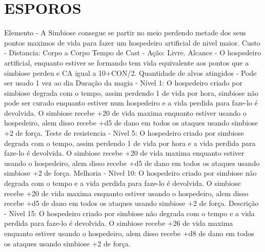 \documentclass{article}%
\begin{document}
%
\section{ESPOROS}%
\label{sec:ESPOROS}%
Elemento {-}  A Simbiose consegue se partir no meio perdendo metade dos seus pontos maximos de vida para fazer um hospedeiro artificial de nivel maior.\newline%
Custo {-} Distancia: Corpo a Corpo\newline%
Tempo de Cast {-} Ação: Livre.\newline%
Alcance {-} O hospedeiro artificial, enquanto estiver se formando tem vida equivalente aos pontos que a simbiose perdeu e CA igual a 10+CON/2.\newline%
Quantidade de alvos atingidos {-} Pode ser usado 1 vez ao dia\newline%
Duração da magia {-} Nível 1: O hospedeiro criado por simbiose degrada com o tempo, assim perdendo 1 de vida por hora, simbiose não pode ser curado enquanto estiver num hospedeiro e a vida perdida para faze{-}lo é devolvida. O simbiose recebe +20 de vida maxima enquanto estiver usando o hospedeiro, alem disso recebe +d5 de dano em todos os ataques usando simbiose +2 de força.\newline%
Teste de resistencia {-} Nível 5: O hospedeiro criado por simbiose degrada com o tempo, assim perdendo 1 de vida por hora e a vida perdida para faze{-}lo é devolvida. O simbiose recebe +20 de vida maxima enquanto estiver usando o hospedeiro, alem disso recebe +d5 de dano em todos os ataques usando simbiose +2 de força.\newline%
Melhoria {-} Nível 10: O hospedeiro criado por simbiose não degrada com o tempo e a vida perdida para faze{-}lo é devolvida. O simbiose recebe +20 de vida maxima enquanto estiver usando o hospedeiro, alem disso recebe +d5 de dano em todos os ataques usando simbiose +2 de força.\newline%
Descrição {-} Nível 15: O hospedeiro criado por simbiose não degrada com o tempo e a vida perdida para faze{-}lo é devolvida. O simbiose recebe +26 de vida maxima enquanto estiver usando o hospedeiro, alem disso recebe +d8 de dano em todos os ataques usando simbiose +2 de força.\newline%

%
\end{document}
